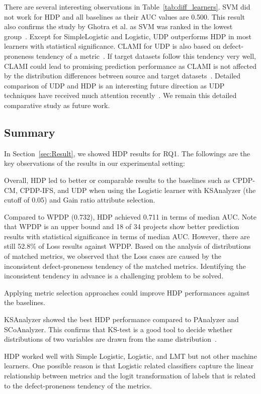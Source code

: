 There are several interesting observations in Table~\ref{tab:diff_learners}. SVM did not work for HDP and all baselines as their AUC values are 0.500.
This result also confirms the study by Ghotra et al. as SVM was ranked in the lowest group~\cite{Ghotra15}. Except for SimpleLogistic and Logistic, UDP outperforms HDP in most learners with statistical significance. CLAMI for UDP is also based on defect-proneness tendency of a metric~\cite{nam2015clami}. If target datasets follow this tendency very well, CLAMI could lead to promising prediction performance as CLAMI is not affected by the distribution differences between source and target datasets~\cite{nam2015clami}. Detailed comparison of UDP and HDP is an interesting future direction as UDP techniques have received much attention recently~\cite{nam2015clami,Zhang2016ICSE,Yang2016FSE}. We remain this detailed comparative study as future work.

\subsection{Summary}
In Section~\ref{sec:Result}, we showed HDP results for RQ1. The followings are the key observations of the results in our experimental setting:
\squishlist
    \item Overall, HDP led to better or comparable results to the baselines such as CPDP-CM, CPDP-IFS, and UDP when using the Logistic learner with KSAnalyzer (the cutoff of 0.05) and Gain ratio attribute selection.
    \item Compared to WPDP (0.732), HDP achieved 0.711 in terms of median AUC. Note that WPDP is an upper bound and 18 of 34 projects show better prediction results with statistical significance in terms of median AUC. However, there are still 52.8\% of Loss results against WPDP. Based on the analysis of distributions of matched metrics, we observed that the Loss cases are caused by the inconsistent defect-proneness tendency of the matched metrics. Identifying the inconsistent tendency in advance is a challenging problem to be solved.
    \item Applying metric selection approaches could improve HDP performances against the baselines.
    \item KSAnalyzer showed the best HDP performance compared to PAnalyzer and SCoAnalyzer. This confirms that KS-test is a good tool to decide whether distributions of two variables are drawn from the same distribution~\cite{Lilliefors67,Massey51}.
    \item HDP worked well with Simple Logistic, Logistic, and LMT but not other machine learners. One possible reason is that Logistic related classifiers capture the linear relationship between metrics and the logit transformation of labels that is related to the defect-proneness tendency of the metrics.
\squishend

